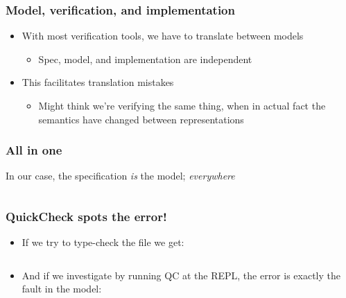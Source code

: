 \documentclass[compress,handout]{beamer}
\begin{document}
\begin{frame}[fragile]
  \frametitle{Model, verification, and implementation}
  \begin{itemize}
    \item<1-> With most verification tools, we have to translate between models
    \begin{itemize}
      \item<1-> Spec, model, and implementation are independent
    \end{itemize}
    \item<2-> This facilitates translation mistakes
    \begin{itemize}
      \item<2-> Might think we're verifying the same thing, when in actual fact
                the semantics have changed between representations
    \end{itemize}
  \end{itemize}

\end{frame}


\begin{frame}[fragile]
  \frametitle{All in one}

  
  In our case, the specification \textit{is} the model; \textit{everywhere}

  \inputminted[fontsize=\footnotesize]{Idris}{qc-things/ATM-arb-trace.idr}

\end{frame}


\begin{frame}
  \frametitle{QuickCheck spots the error!}

  \begin{itemize}
    \item<1-> If we try to type-check the file we get:
              \vspace*{1mm}
              \inputminted[fontsize=\scriptsize]{Idris}{qc-things/ATM-qc-error.idr}
    \item<2-> And if we investigate by running QC at the REPL, the error is
              exactly the fault in the model:
              \vspace*{1mm}
              \inputminted[fontsize=\scriptsize]{Idris}{qc-things/qc-trace-4.idr}
              \vspace*{-4mm}
  \end{itemize}

\end{frame}


\end{document}
